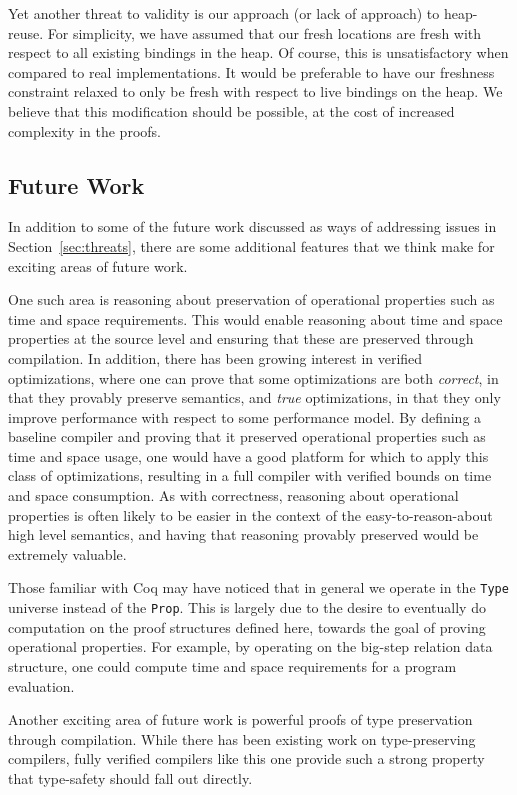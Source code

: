 Yet another threat to validity is our approach (or lack of approach) to
heap-reuse. For simplicity, we have assumed that our fresh locations are fresh
with respect to all existing bindings in the heap. Of course, this is
unsatisfactory when compared to real implementations. It would be preferable to
have our freshness constraint relaxed to only be fresh with respect to live
bindings on the heap. We believe that this modification should be possible, at
the cost of increased complexity in the proofs. 

\subsection{Future Work}

In addition to some of the future work discussed as ways of addressing issues 
in Section~\ref{sec:threats}, there are some additional features that we think
make for exciting areas of future work. 

One such area is reasoning about preservation of operational properties such as
time and space requirements. This would enable reasoning about time and space
properties at the source level and ensuring that these are preserved through
compilation. In addition, there has been growing interest in verified
optimizations, where one can prove that some optimizations are both
\emph{correct}, in that they provably preserve semantics, and \emph{true}
optimizations, in that they only improve performance with respect to some
performance model. By defining a baseline compiler and proving that it preserved
operational properties such as time and space usage, one would have a good
platform for which to apply this class of optimizations, resulting in a full
compiler with verified bounds on time and space consumption. As with
correctness, reasoning about operational properties is often likely to be easier
in the context of the easy-to-reason-about high level semantics, and having that
reasoning provably preserved would be extremely valuable. 

Those familiar with Coq may have noticed that in general we operate in the
\texttt{Type} universe instead of the \texttt{Prop}. This is largely due to the
desire to eventually do computation on the proof structures defined here,
towards the goal of proving operational properties. For example, by operating on 
the big-step relation data structure, one could compute time and space
requirements for a program evaluation.

Another exciting area of future work is powerful proofs of type preservation
through compilation.  While there has been existing work on type-preserving
compilers, fully verified compilers like this one provide such a strong property
that type-safety should fall out directly.

